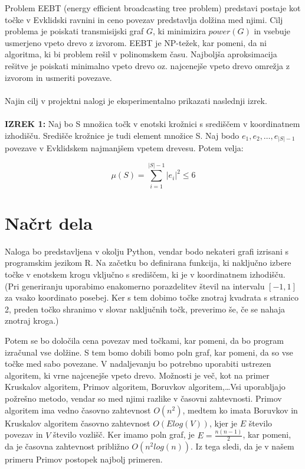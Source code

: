 \documentclass[a4paper]{report}
\begin{document}
Problem EEBT (energy efficient broadcasting tree problem) predstavi postaje kot točke v Evklidski ravnini in ceno povezav predstavlja dolžina med njimi. Cilj problema je poiskati transmisijski graf $G$, ki minimizira $power(G)$ in vsebuje usmerjeno vpeto drevo z izvorom. EEBT je NP-težek, kar pomeni, da ni algoritma, ki bi problem rešil v polinomskem času. Najboljša aproksimacija rešitve je poiskati minimalno vpeto drevo oz. najcenejše vpeto drevo omrežja z izvorom in usmeriti povezave.
\\
\\
Najin cilj v projektni nalogi je eksperimentalno prikazati naslednji izrek.\\
\\
\textbf{IZREK 1:} Naj bo S množica točk v enotski krožnici s središčem v koordinatnem izhodišču. Središče krožnice je tudi element množice S. Naj bodo $e_1, e_2, \ldots, e_{|S|-1}$ povezave v Evklidskem najmanjšem vpetem drevesu. Potem velja: 

$$ \mu (S) = \sum_{i=1}^{|S|-1} |e_i|^2 \leq 6 $$


\section*{Načrt dela}

Naloga bo predstavljena v okolju Python, vendar bodo nekateri grafi izrisani s programskim jezikom R. Na začetku bo definirana funkcija, ki naključno izbere točke v enotskem krogu vključno s središčem, ki je v koordinatnem izhodišču. (Pri generiranju uporabimo enakomerno porazdelitev števil na intervalu $[-1,1]$ za vsako koordinato posebej. Ker s tem dobimo točke znotraj kvadrata s stranico 2, preden točko shranimo v slovar naključnih točk, preverimo še, če se nahaja znotraj kroga.)

Potem se bo določila cena povezav med točkami, kar pomeni, da bo program izračunal vse dolžine. S tem bomo dobili bomo poln graf, kar pomeni, da so vse točke med sabo povezane. V nadaljevanju bo potrebno uporabiti ustrezen algoritem, ki vrne najcenejše vpeto drevo. Možnosti je več, kot na primer Kruskalov algoritem, Primov algoritem, Boruvkov algoritem,\ldots Vsi uporabljajo požrešno metodo, vendar so med njimi razlike v časovni zahtevnosti. Primov algoritem ima vedno časovno zahtevnost $O(n^2)$, medtem ko imata Boruvkov in Kruskalov algoritem  časovno zahtevnost $O(Elog(V))$, kjer je $E$ število povezav in $V$ število vozlišč. Ker imamo poln graf, je $E=\frac{n(n-1)}{2}$, kar pomeni, da je časovna zahtevnost približno $O(n^2log(n))$. Iz tega sledi, da je v našem primeru Primov postopek najbolj primeren. 
\end{document}
